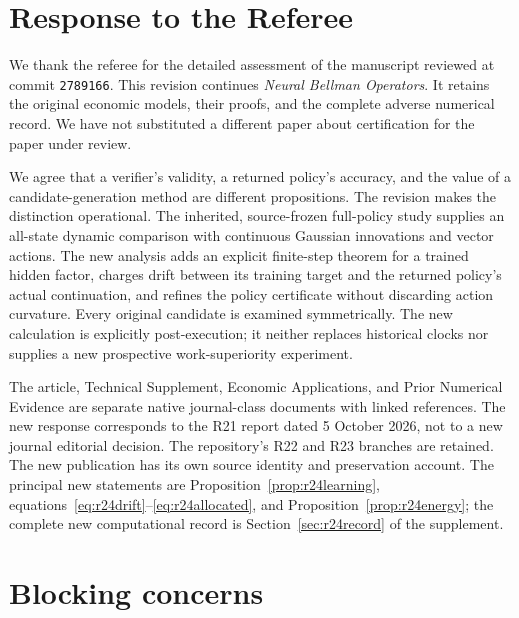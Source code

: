 \section*{Response to the Referee}
We thank the referee for the detailed assessment of the manuscript reviewed
at commit \texttt{2789166}. This revision continues \emph{Neural Bellman
Operators}. It retains the original economic models, their proofs, and the
complete adverse numerical record. We have not substituted a different
paper about certification for the paper under review.

We agree that a verifier's validity, a returned policy's accuracy, and the
value of a candidate-generation method are different propositions. The
revision makes the distinction operational. The inherited, source-frozen
full-policy study supplies an all-state dynamic comparison with continuous
Gaussian innovations and vector actions. The new analysis adds an explicit
finite-step theorem for a trained hidden factor, charges drift between its
training target and the returned policy's actual continuation, and refines
the policy certificate without discarding action curvature. Every original
candidate is examined symmetrically. The new calculation is explicitly
post-execution; it neither replaces historical clocks nor supplies a new
prospective work-superiority experiment.

The article, Technical Supplement, Economic Applications, and Prior Numerical
Evidence are separate native journal-class documents with linked references.
The new response corresponds to the R21 report dated 5 October 2026, not to
a new journal editorial decision. The repository's R22 and R23 branches are
retained. The new publication has its own source identity and preservation
account. The principal new statements are
Proposition~\ref{prop:r24learning}, equations~\eqref{eq:r24drift}--\eqref{eq:r24allocated},
and Proposition~\ref{prop:r24energy}; the complete new computational record
is Section~\ref{sec:r24record} of the supplement.

\section*{Blocking concerns}
